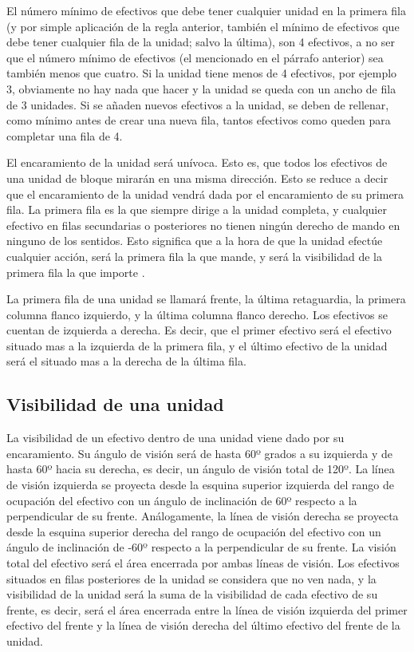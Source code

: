 El número mínimo de efectivos que debe tener cualquier unidad en la
primera fila (y por simple aplicación de la regla anterior, también el
mínimo de efectivos que debe tener cualquier fila de la unidad; salvo
la última), son 4 efectivos, a no ser que el número mínimo de
efectivos (el mencionado en el párrafo anterior) sea también menos que
cuatro. Si la unidad tiene menos de 4 efectivos, por ejemplo 3,
obviamente no hay nada que hacer y la unidad se queda con un ancho de
fila de 3 unidades. Si se añaden nuevos efectivos a la unidad, se
deben de rellenar, como mínimo antes de crear una nueva fila, tantos
efectivos como queden para completar una fila de 4.

El encaramiento de la unidad será unívoca. Esto es, que todos los
efectivos de una unidad de bloque mirarán en una misma dirección. Esto
se reduce a decir que el encaramiento de la unidad vendrá dada por el
encaramiento de su primera fila. La primera fila es la que siempre
dirige a la unidad completa, y cualquier efectivo en filas secundarias
o posteriores no tienen ningún derecho de mando en ninguno de los
sentidos. Esto significa que a la hora de que la unidad efectúe
cualquier acción, será la primera fila la que mande, y será la
visibilidad de la primera fila la que importe .

La primera fila de una unidad se llamará frente, la última
retaguardia, la primera columna flanco izquierdo, y la última columna
flanco derecho. Los efectivos se cuentan de izquierda a derecha. Es
decir, que el primer efectivo será el efectivo situado mas a la
izquierda de la primera fila, y el último efectivo de la unidad será
el situado mas a la derecha de la última fila.

\subsection*{Visibilidad de una unidad}
\label{visibilidad}
La visibilidad de un efectivo dentro de una unidad viene dado por su encaramiento. Su
ángulo de visión será de hasta 60º grados a su izquierda y de hasta
60º hacia su derecha, es decir, un ángulo de visión total de 120º. La
línea de visión izquierda se proyecta desde la esquina superior
izquierda del rango de ocupación del efectivo con un ángulo de
inclinación de 60º respecto a la perpendicular de su
frente. Análogamente, la línea de visión derecha se proyecta desde la
esquina superior derecha del rango de ocupación del efectivo con un
ángulo de inclinación de -60º respecto a la perpendicular de su
frente. La visión total del efectivo será el área encerrada por ambas
líneas de visión. Los efectivos situados en filas posteriores de la
unidad se considera que no ven nada, y la visibilidad de la unidad
será la suma de la visibilidad de cada efectivo de su frente, es
decir, será el área encerrada entre la línea de visión izquierda del
primer efectivo del frente y la línea de visión derecha del último
efectivo del frente de la unidad.

